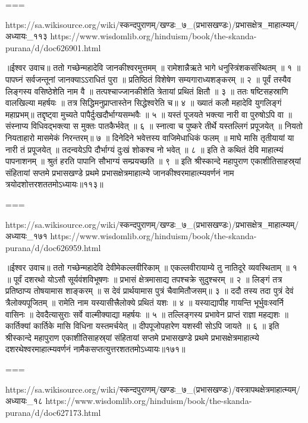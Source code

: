 ===

https://sa.wikisource.org/wiki/स्कन्दपुराणम्/खण्डः_७_(प्रभासखण्डः)/प्रभासक्षेत्र_माहात्म्यम्/अध्यायः_११३
https://www.wisdomlib.org/hinduism/book/the-skanda-purana/d/doc626901.html

॥ईश्वर उवाच॥
ततो गच्छेन्महादेवि जानकीश्वरमुत्तमम् ॥
रामेशान्नैऋते भागे धनुस्त्रिंशकसंस्थितम् ॥ १ ॥
पापघ्नं सर्वजन्तूनां जानक्याऽऽराधितं पुरा ॥
प्रतिष्ठितं विशेषेण सम्यगाराध्यशङ्करम् ॥ २ ॥
पूर्वं तस्यैव लिङ्गस्य वसिष्ठेशेति नाम वै ॥
तत्पश्चाज्जानकीशेति त्रेतायां प्रथितं क्षितौ ॥ ३ ॥
ततः षष्टिसहस्राणि वालखिल्या महर्षयः ॥
तत्र सिद्धिमनुप्राप्तास्तेन सिद्धेश्वरेति च॥ ४ ॥
ख्यातं कलौ महादेवि युगलिङ्गं महाप्रभम्॥
तद्दृष्ट्वा मुच्यते पापैर्दुःखदौर्भाग्यसम्भवैः ॥ ५ ॥
यस्तं पूजयते भक्त्या नारी वा पुरुषोऽपि वा ॥
संस्नाप्य विधिवद्भक्त्या स मुक्तः पातकैर्भवेत् ॥ ६ ॥
स्नात्वा च पुष्करे तीर्थे यस्तल्लिगं प्रपूजयेत् ॥
नियतो नियताहारो मासमेकं निरन्तरम्॥ ७ ॥
दिनेदिने भवेत्तस्य वाजिमेधाधिकं फलम् ॥
माघे मासि तृतीयायां या नारी तं प्रपूजयेत् ॥
तदन्वयेऽपि दौर्भाग्यं दुःखं शोकश्च नो भवेत् ॥ ८ ॥
इति ते कथितं देवि माहात्म्यं पापनाशनम् ॥
श्रुतं हरति पापानि सौभाग्यं सम्प्रयच्छति ॥ ९ ॥
इति श्रीस्कान्दे महापुराण एकाशीतिसाहस्र्यां संहितायां सप्तमे प्रभासखण्डे प्रथमे प्रभासक्षेत्रमाहात्म्ये जानकीश्वरमाहात्म्यवर्णनं नाम त्रयोदशोत्तरशततमोऽध्यायः॥११३॥

===

https://sa.wikisource.org/wiki/स्कन्दपुराणम्/खण्डः_७_(प्रभासखण्डः)/प्रभासक्षेत्र_माहात्म्यम्/अध्यायः_१७१
https://www.wisdomlib.org/hinduism/book/the-skanda-purana/d/doc626959.html

॥ईश्वर उवाच॥
ततो गच्छेन्महादेवि देवीमेकल्लवीरिकाम् ॥
एकल्लवीरायाम्ये तु नातिदूरे व्यवस्थिताम् ॥ १ ॥
पूर्वं दशरथो योऽसौ सूर्यवंशविभूषणः ॥
प्रभासं क्षेत्रमासाद्य तपश्चक्रे सुदुश्चरम् ॥ २ ॥
लिङ्गं तत्र प्रतिष्ठाप्य तोषयामास शाङ्करम् ॥
स देवं प्रार्थयामास पुत्रं चैवामितौजसम्॥ ३ ॥
ददौ तस्य तदा पुत्रं देवं त्रैलोक्यपूजितम् ॥
रामेति नाम यस्यासीत्त्रैलोक्ये प्रथितं यशः ॥ ४ ॥
यस्याद्यापीह गायन्ति भूर्भुवःस्वर्नि वासिनः ॥
देवदैत्यासुराः सर्वे वाल्मीक्याद्या महर्षयः ॥ ५ ॥
तल्लिङ्गस्य प्रभावेन प्राप्तं राज्ञा महद्यशः ॥
कार्तिक्यां कार्तिके मासि विधिना यस्तमर्चयेत् ॥
दीपपूजोपहारेण यशस्वी सोऽपि जायते ॥ ६ ॥
इति श्रीस्कान्दे महापुराण एकाशीतिसाहस्र्यां संहितायां सप्तमे प्रभासखण्डे प्रथमे प्रभासक्षेत्रमाहात्म्ये दशरथेश्वरमाहात्म्यवर्णनं नामैकसप्तत्युत्तरशततमोऽध्यायः॥१७१॥

===

https://sa.wikisource.org/wiki/स्कन्दपुराणम्/खण्डः_७_(प्रभासखण्डः)/वस्त्रापथक्षेत्रमाहात्म्यम्/अध्यायः_१८
https://www.wisdomlib.org/hinduism/book/the-skanda-purana/d/doc627173.html

